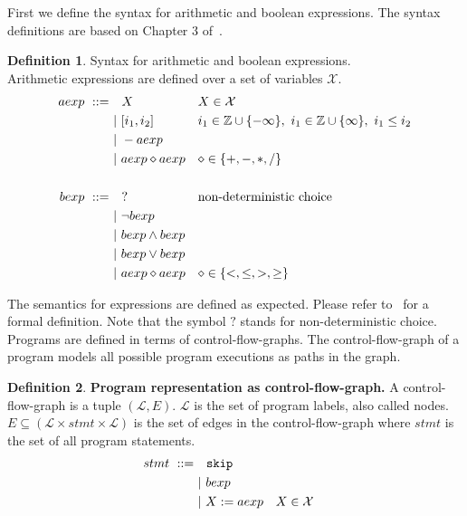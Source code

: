 \documentclass[11pt,a4paper,titlepage]{article}
\theoremstyle{definition}
\newtheorem{definition}{Definition}[section]
\begin{document}
First we define the syntax for arithmetic and boolean expressions. 
The syntax definitions are based on Chapter 3 of~\cite{UrbanPhd}.

\begin{definition}\label{def:arith_bool_syntax}
    Syntax for arithmetic and boolean expressions. \\
    Arithmetic expressions are defined over a set of variables $\mathcal{X}$.
    \begin{align*}
        \setlength{\jot}{15pt}
        aexp \ ::= \ & \ \ X && X \in \mathcal{X} \\
        &| \  [i_1, i_2] && i_1 \in \mathbb{Z} \cup \{ -\infty \},\ i_1 \in \mathbb{Z} \cup \{\infty \},\ i_1 \leq i_2  \\
        &| \  - aexp \\
        &| \  aexp \diamond aexp && \diamond \in \{ +, -, *, / \}\\
        \\
        bexp \ ::= \ & \ \ ?  && \text{non-deterministic choice} \\
        &| \  \neg bexp \\
        &| \  bexp \land bexp \\
        &| \  bexp \lor bexp \\
        &| \  aexp \diamond aexp && \diamond \in \{<, \leq, >, \geq \}\\
    \end{align*}
\end{definition}

The semantics for expressions are defined as expected. 
Please refer to~\cite{UrbanPhd} for a formal definition. 
Note that the symbol $?$ stands for non-deterministic choice.\\

Programs are defined in terms of control-flow-graphs. The control-flow-graph of a program models all possible program executions as
paths in the graph.

\begin{definition}\label{def:control_flow_graph}
    \textbf{Program representation as control-flow-graph.}
    A control-flow-graph is a tuple $(\mathcal{L}, E)$.
    $\mathcal{L}$ is the set of program labels, also called nodes. 
    $E \subseteq (\mathcal{L} \times stmt \times \mathcal{L})$ is the set of edges in the control-flow-graph where
    $stmt$ is the set of all program statements.
    \begin{align*}
        \setlength{\jot}{15pt}
        stmt \ ::= \ & \ \ \mathtt{skip} \\
        &| \ bexp \\
        &| \ X := aexp  && X \in \mathcal{X} \\
    \end{align*}
\end{definition}
\end{document}
